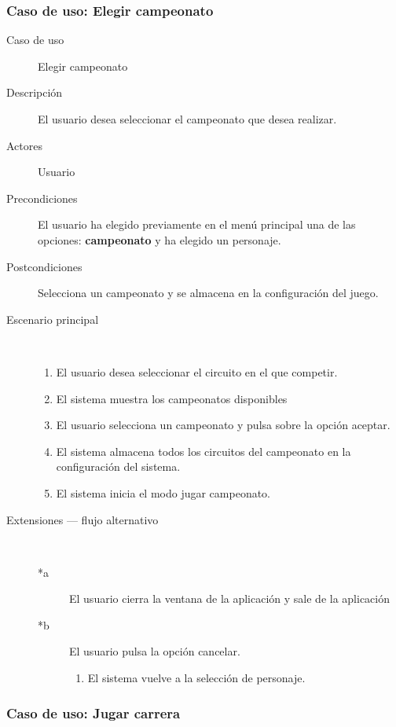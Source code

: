 \subsubsection{Caso de uso: Elegir campeonato}

\begin{description}
    \item[Caso de uso] Elegir campeonato
    \item[Descripción] El usuario desea seleccionar el campeonato que desea realizar.
    \item[Actores] Usuario
    \item[Precondiciones] El usuario ha elegido previamente en el menú principal una de las opciones: \textbf{campeonato} y ha
    elegido un personaje.
    \item[Postcondiciones] Selecciona un campeonato y se almacena en la configuración del juego.
    \item[Escenario principal] $\quad$
        \begin{enumerate}
            \item El usuario desea seleccionar el circuito en el que competir.
            \item El sistema muestra los campeonatos disponibles
            \item El usuario selecciona un campeonato y pulsa sobre la opción aceptar.
            \item El sistema almacena todos los circuitos del campeonato en la configuración del sistema.
            \item El sistema inicia el modo jugar campeonato.
        \end{enumerate}
    \item[Extensiones --- flujo alternativo] $\quad$
        \begin{description}
            \item[*a ] El usuario cierra la ventana de la aplicación y sale de la aplicación
            \item[*b ] El usuario pulsa la opción cancelar.
            \begin{enumerate}
                \item El sistema vuelve a la selección de personaje.
            \end{enumerate}
        \end{description}
\end{description}

\subsubsection{Caso de uso: Jugar carrera}

